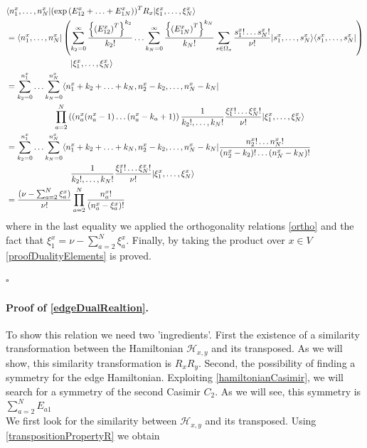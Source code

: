 \documentclass[10pt]{article}
\numberwithin{equation}{section}
\numberwithin{equation}{subsection}
\begin{document}
\begin{align*}
&\langle n_{1}^{x},\ldots,n_{N}^{x}|(\exp{(E_{12}^{x}+\ldots+E_{1N}^{x})})^{T}R_{x}|\xi_{1}^{x},\ldots,\xi_{N}^{x}\rangle\\&= \langle  n_{1}^{x},\ldots,n_{N}^{x}|\left(\sum_{k_{2}=0}^{\infty}\frac{\left\{\left(E_{12}^{x}\right)^{T}\right\}^{k_{2}}}{k_{2}!}\ldots\sum_{k_{N}=0}^{\infty}\frac{\left\{\left(E_{1N}^{x}\right)^{T}\right\}^{k_{N}}}{k_{N}!}\sum_{s\in\Omega_{x}}\frac{s_{1}^{x}!\ldots s_{N}^{x}!}{\nu!}|s_{1}^{x},\ldots,s_{N}^{x}\rangle\langle s_{1}^{x},\ldots,s_{N}^{x}|\right)
\\&
\hspace{2.cm}\qquad|\xi_{1}^{x},\ldots,\xi_{N}^{x}\rangle
\\&=
\sum_{k_{2}=0}^{n_{1}^{x}}\ldots\sum_{k_{N}=0}^{n_{N}^{x}}\langle n_{1}^{x}+k_{2}+\ldots+k_{N},n_{2}^{x}-k_{2},\ldots,n_{N}^{x}-k_{N}|
\\&
\hspace{2.cm}\prod_{a=2}^{N}\left((n_{a}^{x}(n_{a}^{x}-1)\ldots (n_{a}^{x}-k_{a}+1)\right)\frac{1}{k_{2}!,\ldots,k_{N}!}\frac{\xi_{1}^{x}!\ldots \xi_{N}^{x}!}{\nu!}|\xi_{1}^{x},\ldots,\xi_{N}^{x}\rangle
\\&=
\sum_{k_{2}=0}^{n_{1}^{x}}\ldots\sum_{k_{N}=0}^{n_{N}^{x}}\langle n_{1}^{x}+k_{2}+\ldots+k_{N},n_{2}^{x}-k_{2},\ldots,n_{N}^{x}-k_{N}|\frac{n_{2}^{x}!\ldots n_{N}^{x}!}{(n_{2}^{x}-k_{2})!\ldots(n_{N}^{x}-k_{N})!}
\\& 
\hspace{2.cm}\qquad\frac{1}{k_{2}!,\ldots,k_{N}!}\frac{\xi_{1}^{x}!\ldots \xi_{N}^{x}!}{\nu!}|\xi_{1}^{x},\ldots,\xi_{N}^{x}\rangle
\\&=
\frac{(\nu-\sum_{a=2}^{N}\xi_{a}^{x})}{\nu!}\prod_{a=2}^{N}\frac{n_{a}^{x}!}{(n_{a}^{x}-\xi_{a}^{x})!}
\end{align*}
where in the last equality we applied the orthogonality relations \eqref{ortho} and the fact that $\xi_{1}^{x}=\nu-\sum_{a=2}^{N}\xi_{a}^{x}$. Finally, by taking the product over $x\in V$ \eqref{proofDualityElements} is proved.
\begin{flushright}
    $\square$
\end{flushright}
\paragraph{Proof of \eqref{edgeDualRealtion}.}To show this relation we need two 'ingredients'. First the existence of a similarity transformation between the Hamiltonian $\mathcal{H}_{x,y}$  and its transposed. As we will show, this similarity transformation is $R_{x}R_{y}$.  Second, the possibility of finding a symmetry for the edge Hamiltonian. Exploiting \eqref{hamiltonianCasimir}, we will search for a symmetry of the second Casimir $C_{2}$. As we will see, this symmetry is $\sum_{a=2}^{N}E_{a1}$ \\
We first look for the similarity between $\mathcal{H}_{x,y}$ and its transposed. Using \eqref{transpositionPropertyR} we obtain 
 
\end{document}
